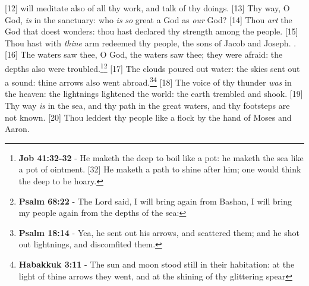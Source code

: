 [12] \textcolor[cmyk]{0.99998,1,0,0}{ will meditate also of all thy work, and talk of thy doings.}
[13] \textcolor[cmyk]{0.99998,1,0,0}{Thy way, O God, \emph{is} in the sanctuary: who \emph{is} \emph{so} great a God as \emph{our} God?}
[14] \textcolor[cmyk]{0.99998,1,0,0}{Thou \emph{art} the God that doest wonders: thou hast declared thy strength among the people.}
[15] \textcolor[cmyk]{0.99998,1,0,0}{Thou hast with \emph{thine} arm redeemed thy people, the sons of Jacob and Joseph. .}
[16] \textcolor[cmyk]{0.99998,1,0,0}{The waters saw thee, O God, the waters saw thee; they were afraid: the depths also were troubled.}\footnote{\textbf{Job 41:32-32} - He maketh the deep to boil like a pot: he maketh the sea like a pot of ointment. [32] He maketh a path to shine after him; one would think the deep to be hoary. }\footnote{\textbf{Psalm 68:22} - The Lord said, I will bring again from Bashan, I will bring my people again from the depths of the sea:}
[17] \textcolor[cmyk]{0.99998,1,0,0}{The clouds poured out water: the skies sent out a sound: thine arrows also went abroad.}\footnote{\textbf{Psalm 18:14} - Yea, he sent out his arrows, and scattered them; and he shot out lightnings, and discomfited them.}\footnote{\textbf{Habakkuk 3:11} - The sun and moon stood still in their habitation: at the light of thine arrows they went, and at the shining of thy glittering spear}
[18] \textcolor[cmyk]{0.99998,1,0,0}{The voice of thy thunder \emph{was} in the heaven: the lightnings lightened the world: the earth trembled and shook.}
[19] \textcolor[cmyk]{0.99998,1,0,0}{Thy way \emph{is} in the sea, and thy path in the great waters, and thy footsteps are not known.}
[20] \textcolor[cmyk]{0.99998,1,0,0}{Thou leddest thy people like a flock by the hand of Moses and Aaron.}
